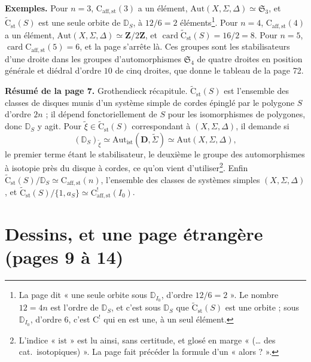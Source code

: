 \documentclass[11pt,a4paper]{article}
\begin{document}
\textbf{Exemples.} Pour $n = 3$, $\mathrm{C}_{\mathrm{aff,st}}(3)$ a un
élément, $\mathrm{Aut}(X, \Sigma, \Delta) \simeq \mathfrak{S}_3$, et
$\widetilde{\mathrm{C}}_{\mathrm{st}}(S)$ est une seule orbite de
$\mathbb{D}_S$, à $12/6 = 2$ éléments\footnote{La page dit « une seule orbite
sous $\mathbb{D}_{I_0}$, d'ordre $12/6 = 2$ ». Le nombre $12 = 4n$ est
l'ordre de $\mathbb{D}_S$, et c'est sous $\mathbb{D}_S$ que
$\widetilde{\mathrm{C}}_{\mathrm{st}}(S)$ est une orbite ; sous
$\mathbb{D}_{I_0}$, d'ordre $6$, c'est $\mathrm{C}^{!}$ qui en est une, à un
seul élément.}. Pour $n = 4$, $\mathrm{C}_{\mathrm{aff,st}}(4)$ a un
élément, $\mathrm{Aut}(X, \Sigma, \Delta) \simeq \mathbf{Z}/2\mathbf{Z}$, et
$\operatorname{card} \widetilde{\mathrm{C}}_{\mathrm{st}}(S) = 16/2 = 8$. Pour
$n = 5$, $\operatorname{card} \mathrm{C}_{\mathrm{aff,st}}(5) = 6$, et la page
s'arrête là. Ces groupes sont les stabilisateurs d'une droite dans les
groupes d'automorphismes $\mathfrak{S}_4$ de quatre droites en position
générale et diédral d'ordre $10$ de cinq droites, que donne le tableau de
la page 72.

\textbf{Résumé de la page 7.} Grothendieck récapitule.
$\widetilde{\mathrm{C}}_{\mathrm{st}}(S)$ est l'ensemble des classes de
disques munis d'un système simple de cordes épinglé par le polygone $S$
d'ordre $2n$ ; il dépend fonctoriellement de $S$ pour les isomorphismes de
polygones, donc $\mathbb{D}_S$ y agit. Pour $\widetilde{\xi} \in
\widetilde{\mathrm{C}}_{\mathrm{st}}(S)$ correspondant à $(X, \Sigma,
\Delta)$, il demande si
\[
(\mathbb{D}_S)_{\widetilde{\xi}} \simeq \mathrm{Aut}_{\mathrm{ist}}(\mathbf{D},
\widetilde{\Sigma}) \simeq \mathrm{Aut}(X, \Sigma, \Delta),
\]
le premier terme étant le stabilisateur, le deuxième le groupe des
automorphismes à isotopie près du disque à cordes, ce qu'on vient
d'utiliser\footnote{L'indice « $\mathrm{ist}$ » est lu ainsi, sans
certitude, et glosé en marge « (\ldots{} des cat.\ isotopiques) ». La page
fait précéder la formule d'un « alors ? ».}. Enfin
$\widetilde{\mathrm{C}}_{\mathrm{st}}(S)/\mathbb{D}_S \simeq
\mathrm{C}_{\mathrm{aff,st}}(n)$, l'ensemble des classes de systèmes simples
$(X, \Sigma, \Delta)$, et $\widetilde{\mathrm{C}}_{\mathrm{st}}(S)/\{1, a_S\}
\simeq \mathrm{C}^{!}_{\mathrm{aff,st}}(I_0)$.

\section*{Dessins, et une page étrangère (pages 9 à 14)}
\end{document}
